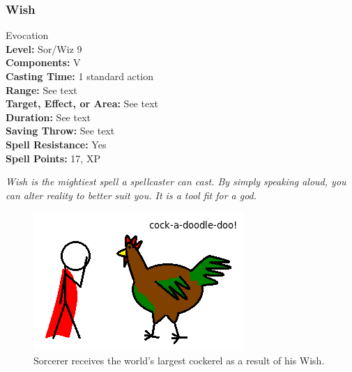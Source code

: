 \subsubsection{Wish}
\label{Spell:Wish}
Evocation
\\ \textbf{Level:} Sor/Wiz 9
\\ \textbf{Components:} V
\\ \textbf{Casting Time:} 1 standard action
\\ \textbf{Range:} See text
\\ \textbf{Target, Effect, or Area:} See text
\\ \textbf{Duration:} See text
\\ \textbf{Saving Throw:} See text
\\ \textbf{Spell Resistance:} Yes
\\ \textbf{Spell Points:} 17, XP

\emph{Wish is the mightiest spell a spellcaster can cast. By simply speaking aloud, you can alter reality to better suit you.
It is a tool fit for a god.}

\begin{figure}
  \caption{Sorcerer receives the world's largest cockerel as a result of his Wish.}
  \centering
    \includegraphics{Pics/Wish.png}
\end{figure}

